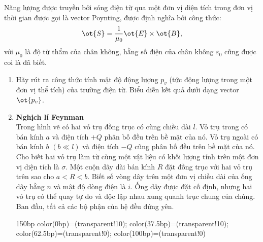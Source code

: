 \begin{loigiai}
\begin{enumerate}[1)]
\begin{center}
\begin{tikzpicture}[x=0.75pt,y=0.75pt,yscale=-1,xscale=1]
\end{tikzpicture}

        \end{center}
    \end{enumerate}
    \end{loigiai}
    
\begin{vd}
Năng lượng được truyền bởi sóng điện từ qua một đơn vị diện tích trong   đơn vị thời gian được gọi là vector Poynting, được định nghĩa bởi công thức: 
$$\ot{S}=\dfrac{1}{\mu_0}\ot{E}\times\ot{B},$$
với $\mu_0$ là độ từ thẩm của chân không, hằng số điện của chân không $\varepsilon_0$ cũng được coi là đã biết.
\begin{enumerate}[1)]
    \item Hãy rút ra công thức tính mật độ động lượng $p_v$ (tức động lượng trong một đơn vị thể tích) của trường điện từ. Biểu diễn kết quả dưới dạng vector $\ot{p_v}$.
    \item \textbf{Nghịch lí Feynman}\\
    Trong hình vẽ có hai vỏ trụ đồng trục có cùng chiều dài $l$. Vỏ trụ trong có bán kính $a$ và điện tích $+Q$ phân bố đều trên bề mặt của nó. Vỏ trụ ngoài có bán kính $b$ $(b\ll l)$ và điện tích $-Q$ cũng phân bố đều trên bề mặt của nó. Cho biết hai vỏ trụ làm từ cùng một vật liệu có khối lượng tính trên một đơn vị diện tích là $\sigma$. Một cuộn dây dài bán kính $R$ đặt đồng trục với hai vỏ trụ trên sao cho $a<R<b$. Biết số vòng dây trên một đơn vị chiều dài của ống dây bằng $n$ và mật độ dòng điện là $i$. Ống dây được đặt cố định, nhưng hai vỏ trụ có thể quay tự do và độc lập nhau xung quanh trục chung của chúng. Ban đầu, tất cả các bộ phận của hệ đều đứng yên.
    \begin{center}
        

  
 {150bp} {color(0bp)=(transparent!10);
color(37.5bp)=(transparent!10);
color(62.5bp)=(transparent!0);
color(100bp)=(transparent!0) } 


\end{center}
\end{enumerate}
\end{vd}
